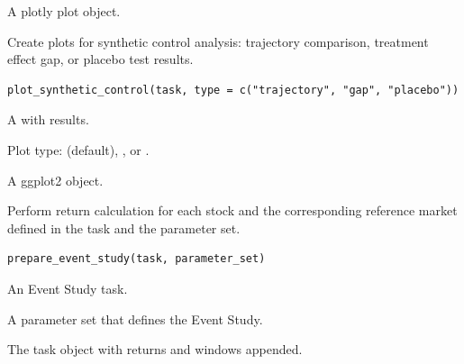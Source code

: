\documentclass[a4paper]{book}
\begin{document}
%
\begin{Value}
A plotly plot object.
\end{Value}
%
\begin{Description}
Create plots for synthetic control analysis: trajectory comparison,
treatment effect gap, or placebo test results.
\end{Description}
%
\begin{Usage}
\begin{verbatim}
plot_synthetic_control(task, type = c("trajectory", "gap", "placebo"))
\end{verbatim}
\end{Usage}
%
\begin{Arguments}
\begin{ldescription}
\item[\code{task}] A  with results.

\item[\code{type}] Plot type:  (default), , or
.
\end{ldescription}
\end{Arguments}
%
\begin{Value}
A ggplot2 object.
\end{Value}
%
\begin{Description}
Perform return calculation for each stock and the corresponding reference
market defined in the task and the parameter set.
\end{Description}
%
\begin{Usage}
\begin{verbatim}
prepare_event_study(task, parameter_set)
\end{verbatim}
\end{Usage}
%
\begin{Arguments}
\begin{ldescription}
\item[\code{task}] An Event Study task.

\item[\code{parameter\_set}] A parameter set that defines the Event Study.
\end{ldescription}
\end{Arguments}
%
\begin{Value}
The task object with returns and windows appended.
\end{Value}
\end{document}
